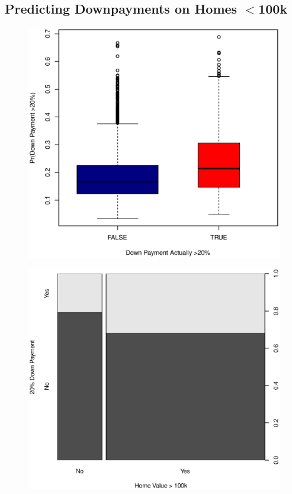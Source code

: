 \documentclass[11pt, fleqn]{article}
\begin{document}
\subsection{Predicting Downpayments on Homes $<$100k}
\begin{figure}[!htb]
  \centering
  \includegraphics[scale=.5]{oos_lt100k.eps}
  \caption{}
  \label{fig:oos_lt100k}
\end{figure}

\begin{figure}[!htb]
  \centering
  \includegraphics[scale=.5]{home_value_vs_20_down.eps}
  \caption{}
  \label{fig:value_20dwn}
\end{figure}
\end{document}
